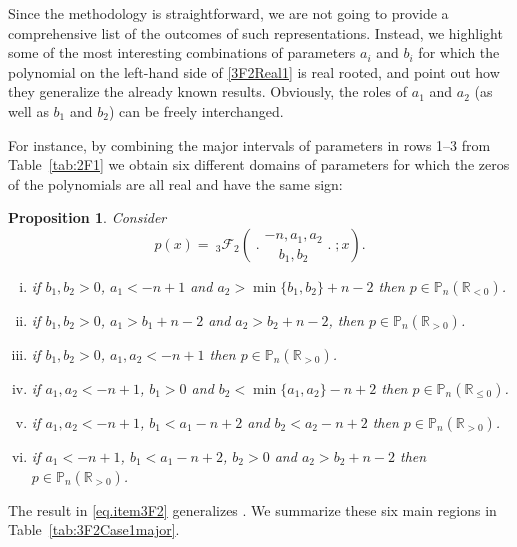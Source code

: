 \documentclass[reqno,11pt]{amsart}
\newtheorem{proposition}[theorem]{Proposition}
\theoremstyle{remark}
\renewcommand{\P}{\mathbb{P}}
\newcommand{\R}{\mathbb{R}}
\newcommand*\pFq[5]{%
 {\ }_{#1}{\mathcal F}_{#2}{\left(\genfrac..{0pt}{}{#3}{#4};#5\right)}%
}
\begin{document}
Since the methodology is straightforward, we are not going to provide a comprehensive list of the outcomes of such representations. Instead, we highlight some of the most interesting combinations of parameters $a_i$ and $ b_i$ for which the polynomial on the left-hand side of \eqref{3F2Real1} is real rooted, and point out how they generalize the already known results. Obviously, the roles of $a_1$ and $a_2$ (as well as $b_1$ and $b_2$) can be freely interchanged. 

For instance, by combining the major intervals of parameters in rows 1--3 from Table~\ref{tab:2F1}  we obtain six different domains of parameters for which the zeros of the polynomials are all real and have the same sign: 
\begin{proposition}
    \label{prop:zeros3F2case1cont}
Consider
 $$
 p(x)= \pFq{3}{2}{-n,a_1,a_2}{b_1,b_2}{x}.
 $$
    \begin{enumerate}[(i)]
        \item if $b_1, b_2>0$, $a_1< -n+1$ and $a_2> \min\{ b_1, b_2\} +n-2$ then $p\in \P_n(\R_{<0})$.  
        \item if $b_1, b_2>0$, $a_1> b_1 + n-2$ and $a_2> b_2+n-2$, then $p\in \P_n(\R_{> 0})$.  
        \item \label{eq.item3F2} if $b_1, b_2>0$, $a_1,a_2< -n+1$ then  $p\in \P_n(\R_{>0})$.  
        \item if $a_1, a_2<-n+1$, $b_1>0$ and $b_2< \min\{ a_1, a_2\} -n+2$ then $p\in \P_n(\R_{\leq 0})$.  
        \item if $a_1, a_2<-n+1$, $b_1< a_1 -n+2$ and $b_2< a_2 -n+2$ then $p\in \P_n(\R_{> 0})$.  
        \item if $a_1<-n+1$, $b_1< a_1 -n+2$, $b_2>0$ and $a_2> b_2+n-2$ then $p\in \P_n(\R_{> 0})$.    
    \end{enumerate}
\end{proposition}

The result in \eqref{eq.item3F2} generalizes \cite[Theorem 9]{MR2324318}.  We summarize these six main regions in Table~\ref{tab:3F2Case1major}. 
\end{document}

